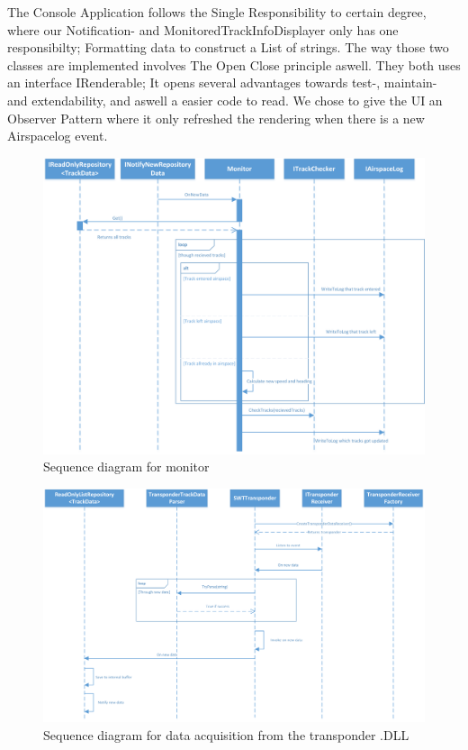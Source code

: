 The Console Application follows the Single Responsibility to certain degree, where our Notification- and MonitoredTrackInfoDisplayer only has one responsibilty; Formatting data to construct a List of strings. The way those two classes are implemented involves The Open Close principle aswell. They both uses an interface IRenderable; It opens several advantages towards test-, maintain- and extendability, and aswell a easier code to read. We chose to give the UI an Observer Pattern where it only refreshed the rendering when there is a new Airspacelog event.  
\begin{figure}
	\centering
	\includegraphics[width=1.0\linewidth]{Images/MonitorSeq}
	\caption{Sequence diagram for monitor}
	\label{fig:MonitorSeq}
\end{figure}

\begin{figure}
	\centering
	\includegraphics[width=1.0\linewidth]{Images/SWTTransponder}
	\caption{Sequence diagram for data acquisition from the transponder .DLL}
	\label{fig:SWTTransponderSeq}
\end{figure}


